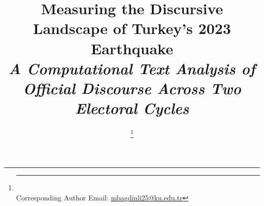 \documentclass[12pt, journal]{IEEEtran}
\begin{document}
\title{Measuring the Discursive Landscape of Turkey's 2023 Earthquake  \\
\textit{A Computational Text Analysis of Official Discourse Across Two Electoral Cycles}}

\author{
\vspace{4pt}
\thanks{\hrule \vspace{4pt} \noindent
\vspace{3pt} \\
Corresponding Author Email: \href{mailto:mbagdinli25@ku.edu.tr}{mbagdinli25@ku.edu.tr} \vspace{3pt}}%
}
\end{document}
